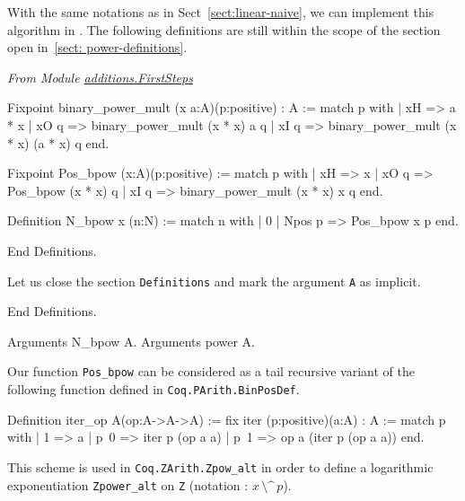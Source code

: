 With the same notations as in Sect~\vref{sect:linear-naive}, we can implement this algorithm in \gallina. The following definitions are still within the scope of the 
section open in~\vref{sect: power-definitions}.



\label{polymorhic-binary_exp}


\vspace{4pt}

\emph{From Module
\href{../theories/html/additions.FirstSteps.html}{additions.FirstSteps}}


\begin{Coqsrc}
Fixpoint binary_power_mult (x a:A)(p:positive) : A 
  :=
  match p with
    | xH =>  a * x
    | xO q => binary_power_mult  (x * x) a q
    | xI q =>  binary_power_mult  (x * x) (a * x) q
  end.

Fixpoint Pos_bpow (x:A)(p:positive) :=
 match p with
  | xH => x
  | xO q => Pos_bpow  (x * x) q
  | xI q => binary_power_mult   (x * x) x q
end.

Definition N_bpow x (n:N) := 
  match n with 
  | 0%
  | Npos p => Pos_bpow x p
  end.

End Definitions.
\end{Coqsrc}




Let us  close the section \texttt{Definitions} and mark the argument \texttt{A} as implicit.

\begin{Coqsrc}
End Definitions.

Arguments N_bpow {A}.
Arguments power {A}.
\end{Coqsrc}


\begin{remark}
Our function \texttt{Pos\_bpow} can be considered as a tail recursive variant
of the following function defined in \texttt{Coq.PArith.BinPosDef}.



\begin{Coqsrc}
Definition iter_op {A}(op:A->A->A) :=
  fix iter (p:positive)(a:A) : A :=
  match p with
    | 1 => a
    | p~0 => iter p (op a a)
    | p~1 => op a (iter p (op a a))
  end.
\end{Coqsrc}

This scheme is used in \texttt{Coq.ZArith.Zpow\_alt} in order to define a logarithmic exponentiation \texttt{Zpower\_alt} on \texttt{Z} (notation : $x\,\texttt{\^{}\^{}}\,p$).

\end{remark}


